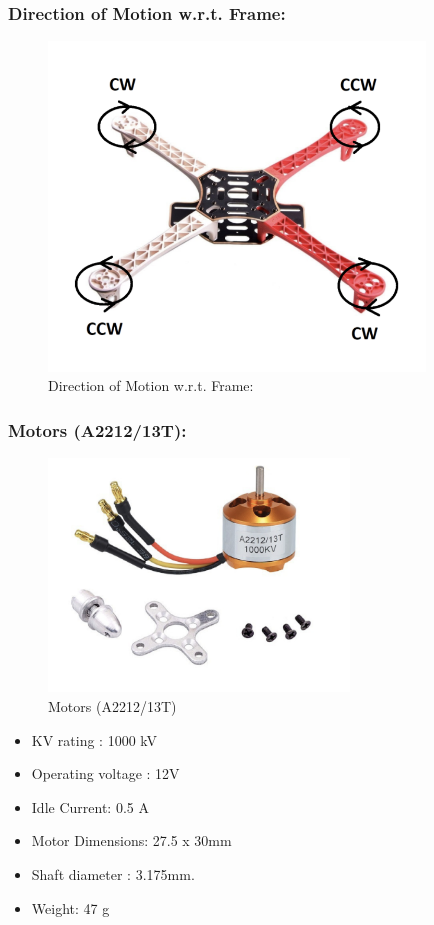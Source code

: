 \newpage
\subsubsection{Direction of Motion w.r.t. Frame:}
\begin{figure}[h!]
\centering
\includegraphics[width=10cm]{./Figures/dir_of_motion_wrt_frame.png}
\caption{Direction of Motion w.r.t. Frame:}
\label{dir_of_motion_wrt_frame}
\end{figure}


\subsubsection{Motors (A2212/13T):}
\begin{figure}[h!]
\centering
\includegraphics[width=8cm]{./Figures/motors_qc.png}
\caption{Motors (A2212/13T)}
\label{motors_qc}
\end{figure}

\begin{itemize}
    \item KV rating : 1000 kV
    \item Operating voltage : 12V
    \item Idle Current: 0.5 A
    \item Motor Dimensions: 27.5 x 30mm
    \item Shaft diameter : 3.175mm. 
    \item Weight: 47 g
\end{itemize}

